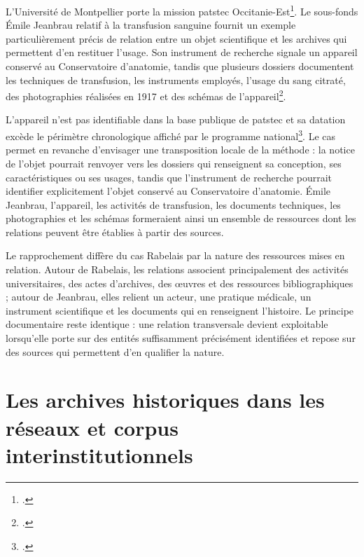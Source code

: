 L'Université de Montpellier porte la mission \gls{patstec} Occitanie-Est\footcite{PATSTECOccitanieEst}. Le sous-fonds Émile Jeanbrau relatif à la transfusion sanguine fournit un exemple particulièrement précis de relation entre un objet scientifique et les archives qui permettent d'en restituer l'usage. Son instrument de recherche signale un appareil conservé au Conservatoire d'anatomie, tandis que plusieurs dossiers documentent les techniques de transfusion, les instruments employés, l'usage du sang citraté, des photographies réalisées en 1917 et des schémas de l'appareil\footcite[notamment 1EJ55, 1EJ59, 1EJ87, 1EJ91--96, 1EJ105, 1EJ107, 1EJ110 et 1EJ144]{BertrandDikoff2024Jeanbrau}.

L'appareil n'est pas identifiable dans la base publique de \gls{patstec} et sa datation excède le périmètre chronologique affiché par le programme national\footcite{PATSTECObjets}. Le cas permet en revanche d'envisager une transposition locale de la méthode : la notice de l'objet pourrait renvoyer vers les dossiers qui renseignent sa conception, ses caractéristiques ou ses usages, tandis que l'instrument de recherche pourrait identifier explicitement l'objet conservé au Conservatoire d'anatomie. Émile Jeanbrau, l'appareil, les activités de transfusion, les documents techniques, les photographies et les schémas formeraient ainsi un ensemble de ressources dont les relations peuvent être établies à partir des sources.

Le rapprochement diffère du cas Rabelais par la nature des ressources mises en relation. Autour de Rabelais, les relations associent principalement des activités universitaires, des actes d'archives, des œuvres et des ressources bibliographiques ; autour de Jeanbrau, elles relient un acteur, une pratique médicale, un instrument scientifique et les documents qui en renseignent l'histoire. Le principe documentaire reste identique : une relation transversale devient exploitable lorsqu'elle porte sur des entités suffisamment précisément identifiées et repose sur des sources qui permettent d'en qualifier la nature.




\chapter{Les archives historiques dans les réseaux et corpus interinstitutionnels}

